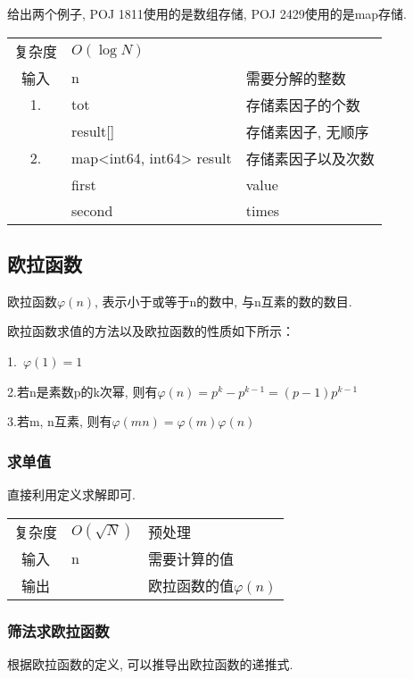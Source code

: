 给出两个例子, POJ 1811使用的是数组存储, POJ 2429使用的是map存储.

\begin{longtable}{|c|l|l|}
复杂度 & $O(\log N)$ &  \\
输入 & n & 需要分解的整数 \\
 1. & tot & 存储素因子的个数 \\
 & result[] & 存储素因子, 无顺序 \\
 2. & map<int64, int64> result & 存储素因子以及次数 \\
 & first & value \\
 & second & times \\
\end{longtable}



    \subsection{欧拉函数}\small
欧拉函数$\varphi (n)$, 表示小于或等于n的数中, 与n互素的数的数目.

欧拉函数求值的方法以及欧拉函数的性质如下所示：

1.\ $\varphi (1) = 1$

2.若n是素数p的k次幂, 则有$\varphi (n) = p^{k} - p^{k - 1} = (p - 1)p^{k - 1}$

3.若m, n互素, 则有$\varphi (mn)=\varphi (m)\varphi (n)$


        \subsubsection{求单值}\small
直接利用定义求解即可.

\begin{longtable}{|c|l|l|}
复杂度 & $O(\sqrt{N})$& 预处理 \\
输入 & n & 需要计算的值 \\
输出 & & 欧拉函数的值$\varphi (n)$ \\
\end{longtable}



        \subsubsection{筛法求欧拉函数}\small
根据欧拉函数的定义, 可以推导出欧拉函数的递推式.

